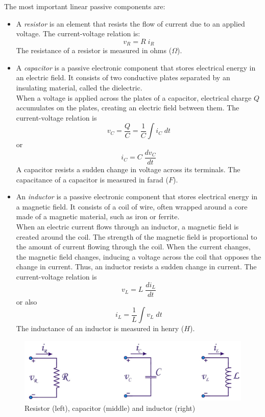 The most important linear passive components are:
\begin{itemize}
	\item A \emph{resistor} is an element that resists the flow of current due to an applied voltage. The current-voltage relation is:
	$$v_R = R\;i_R$$
	The resistance of a resistor is measured in ohms ($\Omega$).
	\item A \emph{capacitor} is a passive electronic component that stores electrical energy in an electric field. It consists of two conductive plates separated by an insulating material, called the dielectric.\\
	When a voltage is applied across the plates of a capacitor, electrical charge $Q$ accumulates on the plates, creating an electric field between them.
	The current-voltage relation is
	$$v_C  = \frac{Q}{C} = \frac{1}{C} \int i_C \; dt$$
	or 
	$$i_C = C  \; \frac{dv_C}{dt}$$
	A capacitor resists a sudden change in voltage across its terminals. The capacitance of a capacitor is measured in farad ($F$).
	\item An \emph{inductor} is a passive electronic component that stores electrical energy in a magnetic field. It consists of a coil of wire, often wrapped around a core made of a magnetic material, such as iron or ferrite.\\	
	When an electric current flows through an inductor, a magnetic field is created around the coil. The strength of the magnetic field is proportional to the amount of current flowing through the coil. When the current changes, the magnetic field changes, inducing a voltage across the coil that opposes the change in current. Thus, an inductor resists a sudden change in current.
	The current-voltage relation is
	$$
	v_L = L  \;  \frac{di_L}{dt}
	$$
	or also
	$$
	i_L = \frac{1}{L}\int v_L  \;  dt
	$$
	The inductance of an inductor is measured in henry ($H$).
	
\end{itemize}

\begin{figure}[h!]
	\centering
	\includegraphics[width=14cm]{figures/ch00/passive.jpg}
	\caption{Resistor (left), capacitor (middle) and inductor (right)}
	\label{fig:passive}
\end{figure}


